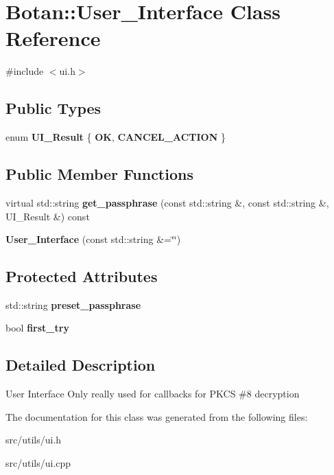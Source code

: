 \hypertarget{classBotan_1_1User__Interface}{\section{Botan\-:\-:User\-\_\-\-Interface Class Reference}
\label{classBotan_1_1User__Interface}
}


{\ttfamily \#include $<$ui.\-h$>$}

\subsection*{Public Types}
\begin{DoxyCompactItemize}
\item 
enum {\bfseries U\-I\-\_\-\-Result} \{ {\bfseries O\-K}, 
{\bfseries C\-A\-N\-C\-E\-L\-\_\-\-A\-C\-T\-I\-O\-N}
 \}
\end{DoxyCompactItemize}
\subsection*{Public Member Functions}
\begin{DoxyCompactItemize}
\item 
\hypertarget{classBotan_1_1User__Interface_a628b57abbc63d9c87788a34fede0b2a8}{virtual std\-::string {\bfseries get\-\_\-passphrase} (const std\-::string \&, const std\-::string \&, U\-I\-\_\-\-Result \&) const }\label{classBotan_1_1User__Interface_a628b57abbc63d9c87788a34fede0b2a8}

\item 
\hypertarget{classBotan_1_1User__Interface_af8d7164def97b5007712be71bcc16a8e}{{\bfseries User\-\_\-\-Interface} (const std\-::string \&=\char`\"{}\char`\"{})}\label{classBotan_1_1User__Interface_af8d7164def97b5007712be71bcc16a8e}

\end{DoxyCompactItemize}
\subsection*{Protected Attributes}
\begin{DoxyCompactItemize}
\item 
\hypertarget{classBotan_1_1User__Interface_ab784a2da1b37fcd5d45830c3da8e9284}{std\-::string {\bfseries preset\-\_\-passphrase}}\label{classBotan_1_1User__Interface_ab784a2da1b37fcd5d45830c3da8e9284}

\item 
\hypertarget{classBotan_1_1User__Interface_ae6241bfb33548300214e4d8b6cc1be6b}{bool {\bfseries first\-\_\-try}}\label{classBotan_1_1User__Interface_ae6241bfb33548300214e4d8b6cc1be6b}

\end{DoxyCompactItemize}


\subsection{Detailed Description}
User Interface Only really used for callbacks for P\-K\-C\-S \#8 decryption 

The documentation for this class was generated from the following files\-:\begin{DoxyCompactItemize}
\item 
src/utils/ui.\-h\item 
src/utils/ui.\-cpp\end{DoxyCompactItemize}
